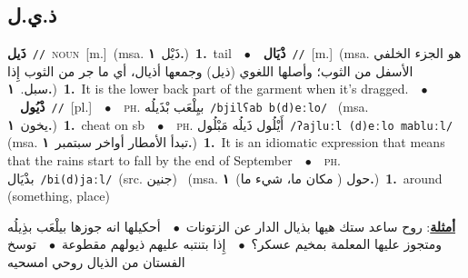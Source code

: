 \documentclass[10pt,a4paper,twoside]{article} %
\begin{document}
\begin{multicols}{2}
{{{{{{{{{{{\vspace{-3mm}
\subsection*{\color{blue}\foreignlanguage{arabic}{ذ.ي.ل}\color{blue}{}} 

{\setlength\topsep{0pt}\textbf{\foreignlanguage{arabic}{ذَيل}}\ {\color{gray}\texttt{//}\color{black}}\ \textsc{noun}\ [m.]\ \color{gray}(msa. \foreignlanguage{arabic}{ذَيْل}~\foreignlanguage{arabic}{\textbf{١.}})\color{black}\ \textbf{1.}~tail\ \ $\bullet$\ \ \setlength\topsep{0pt}\textbf{\foreignlanguage{arabic}{ذْيَال}}\ {\color{gray}\texttt{//}\color{black}}\ [m.]\ \color{gray}(msa. \foreignlanguage{arabic}{هو الجزء الخلفي الأسفل من الثوب؛ وأصلها اللغوي (ذيل) وجمعها أذيال، أي ما جر من الثوب إِذا سبل.}~\foreignlanguage{arabic}{\textbf{١.}})\color{black}\ \textbf{1.}~It is the lower back part of the garment when it's dragged.\ \ $\bullet$\ \ \setlength\topsep{0pt}\textbf{\foreignlanguage{arabic}{ذْيُول}}\ {\color{gray}\texttt{//}\color{black}}\ [pl.]\ \ $\bullet$\ \ \textsc{ph.} \color{gray} \foreignlanguage{arabic}{بيِلْعَب بْذَيلُه}\color{black}\ {\color{gray}\texttt{/{\sffamily bjilʕab b(d)eːlo}/}\color{black}}\ \color{gray} (msa. \foreignlanguage{arabic}{يخون}~\foreignlanguage{arabic}{\textbf{١.}})\color{black}\ \textbf{1.}~cheat on sb\ \ $\bullet$\ \ \textsc{ph.} \color{gray} \foreignlanguage{arabic}{أَيْلُول ذَيلُه مَبْلُول}\color{black}\ {\color{gray}\texttt{/{\sffamily ʔajluːl (d)eːlo mabluːl}/}\color{black}}\ \color{gray} (msa. \foreignlanguage{arabic}{تبدأ الأمطار أواخر سبتمبر}~\foreignlanguage{arabic}{\textbf{١.}})\color{black}\ \textbf{1.}~It is an idiomatic expression that means  that the rains start to fall by the end of September\ \ $\bullet$\ \ \textsc{ph.} \color{gray} \foreignlanguage{arabic}{بذْيَال}\color{black}\ {\color{gray}\texttt{/{\sffamily bi(d)jaːl}/}\color{black}}\ \color{gray}(src. \foreignlanguage{arabic}{جنين})\color{black}\ \color{gray} (msa. \foreignlanguage{arabic}{حول ( مكان ما، شيء ما)}~\foreignlanguage{arabic}{\textbf{١.}})\color{black}\ \textbf{1.}~around (something, place)\  \begin{flushright}\color{gray}\foreignlanguage{arabic}{\textbf{\underline{\foreignlanguage{arabic}{أمثلة}}}: روح ساعد ستك هيها بذيال الدار عن الزتونات\ $\bullet$\ \  أحكيلها انه جوزها بيلْعَب بذِيلُه ومتجوز عليها المعلمة بمخيم عسكر؟\ $\bullet$\ \  إِذا بتنتبه عليهم ذيولهم مقطوعة\ $\bullet$\ \  توسخ الفستان من الذيال روحي امسحيه}\end{flushright}\color{black}} \vspace{2mm}

}}}}}}}}}}}
\end{multicols}
\end{document}
